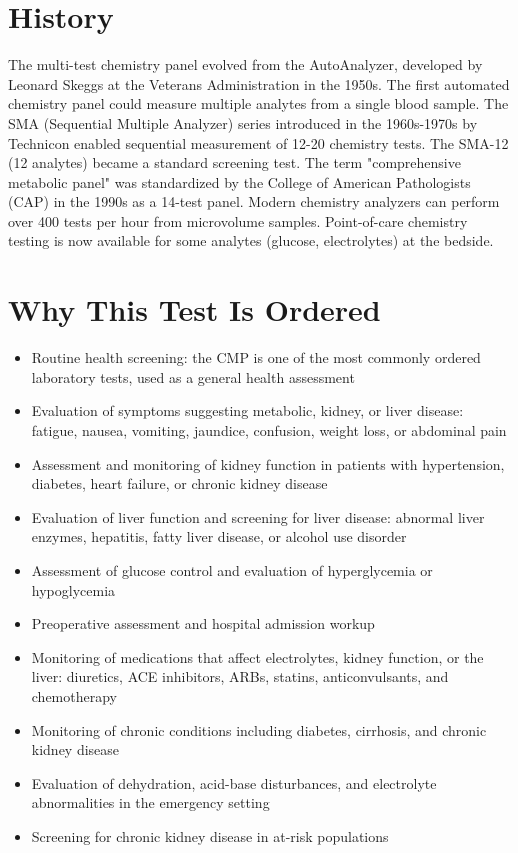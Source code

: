 \section*{History}
The multi-test chemistry panel evolved from the AutoAnalyzer, developed by Leonard Skeggs at the Veterans Administration in the 1950s. The first automated chemistry panel could measure multiple analytes from a single blood sample. The SMA (Sequential Multiple Analyzer) series introduced in the 1960s-1970s by Technicon enabled sequential measurement of 12-20 chemistry tests. The SMA-12 (12 analytes) became a standard screening test. The term "comprehensive metabolic panel" was standardized by the College of American Pathologists (CAP) in the 1990s as a 14-test panel. Modern chemistry analyzers can perform over 400 tests per hour from microvolume samples. Point-of-care chemistry testing is now available for some analytes (glucose, electrolytes) at the bedside.

\section*{Why This Test Is Ordered}
\begin{itemize}
  \item Routine health screening: the CMP is one of the most commonly ordered laboratory tests, used as a general health assessment
  \item Evaluation of symptoms suggesting metabolic, kidney, or liver disease: fatigue, nausea, vomiting, jaundice, confusion, weight loss, or abdominal pain
  \item Assessment and monitoring of kidney function in patients with hypertension, diabetes, heart failure, or chronic kidney disease
  \item Evaluation of liver function and screening for liver disease: abnormal liver enzymes, hepatitis, fatty liver disease, or alcohol use disorder
  \item Assessment of glucose control and evaluation of hyperglycemia or hypoglycemia
  \item Preoperative assessment and hospital admission workup
  \item Monitoring of medications that affect electrolytes, kidney function, or the liver: diuretics, ACE inhibitors, ARBs, statins, anticonvulsants, and chemotherapy
  \item Monitoring of chronic conditions including diabetes, cirrhosis, and chronic kidney disease
  \item Evaluation of dehydration, acid-base disturbances, and electrolyte abnormalities in the emergency setting
  \item Screening for chronic kidney disease in at-risk populations
\end{itemize}


